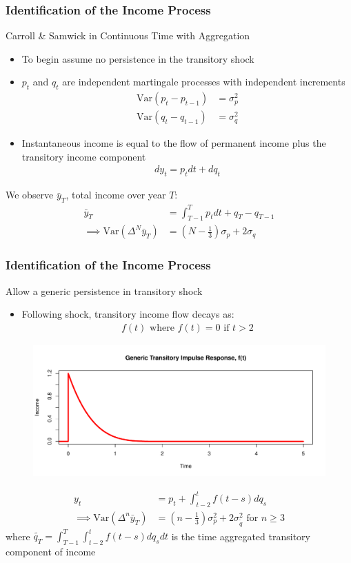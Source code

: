 \documentclass{beamer}
\begin{document}
{
	\frametitle{Identification of the Income Process}
	Carroll \& Samwick in Continuous Time with Aggregation\\
	\begin{itemize}
		\item To begin assume no persistence in the transitory shock
		\item $p_t$ and $q_t$ are independent martingale processes with independent increments
		\begin{align*}
			\mathrm{Var}(p_t-p_{t-1}) &= \sigma^2_p \\
			\mathrm{Var}(q_t-q_{t-1}) &= \sigma^2_q
		\end{align*}
		\item Instantaneous income is equal to the flow of permanent income plus the transitory income component
		\begin{align*}
		dy_t = p_t dt + dq_t
		\end{align*}
	\end{itemize}
	\pause
	We observe $\bar{y}_T$, total income over year $T$:
	\begin{align*}
	\bar{y}_T &= \int_{T-1}^{T}p_t dt + q_T - q_{T-1} \\
	\implies  \mathrm{Var}(\Delta^N \bar{y}_T) &= (N-\frac{1}{3})\sigma_p + 2\sigma_q
	\end{align*}
}
\frame
{
	\frametitle{Identification of the Income Process}
	Allow a generic persistence in transitory shock
	\begin{itemize}
		\item Following shock, transitory income flow decays as:
		\begin{align*}
			f(t)  \text{ where } f(t)=0 \text{ if } t>2
		\end{align*}
	\end{itemize}
	\vspace*{-0.15in}
	\begin{figure}
		\includegraphics[scale=0.3]{../Figures/GenericTransitory.pdf}
	\end{figure}
	\vspace*{-0.15in}
	\begin{align*}
	y_t &= p_t + \int_{t-2}^{t} f(t-s)dq_s\\
	\implies \mathrm{Var}(\Delta^n \bar{y}_T) &= (n-\frac{1}{3})\sigma^2_p +  2 \sigma^2_{\tilde{q}} \text{   for }n \geq 3
	\end{align*}	
	where $	\tilde{q_T} = \int_{T-1}^{T}\int_{t-2}^{t} f(t-s)dq_s dt$ is the time aggregated transitory component of income
}
\end{document}
